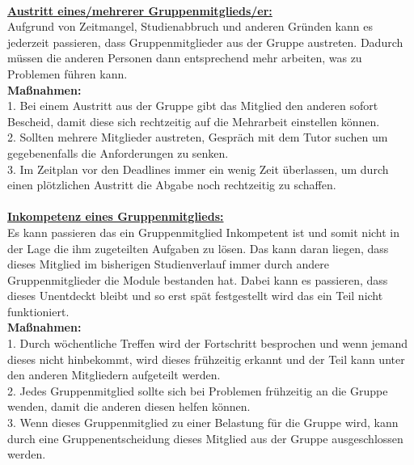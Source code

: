 \documentclass[fontsize=12pt,paper=a4,twoside]{scrartcl}
\begin{document}
\bigskip \\
\textbf{\underline{Austritt eines/mehrerer Gruppenmitglieds/er:}}\\
Aufgrund von Zeitmangel, Studienabbruch und anderen Gründen kann es jederzeit passieren, dass Gruppenmitglieder aus der Gruppe austreten. Dadurch müssen die anderen Personen dann entsprechend mehr arbeiten, was zu Problemen führen kann.\\
\textbf{Maßnahmen:}\\
1. Bei einem Austritt aus der Gruppe gibt das Mitglied den anderen sofort Bescheid, damit diese sich rechtzeitig auf die Mehrarbeit einstellen können.\\
2. Sollten mehrere Mitglieder austreten, Gespräch mit dem Tutor suchen um gegebenenfalls die Anforderungen zu senken.\\
3. Im Zeitplan vor den Deadlines immer ein wenig Zeit überlassen, um durch einen plötzlichen Austritt die Abgabe noch rechtzeitig zu schaffen.\\
\bigskip \\
\textbf{\underline{Inkompetenz eines Gruppenmitglieds:}}\\
Es kann passieren das ein Gruppenmitglied Inkompetent ist und somit nicht in der Lage die ihm zugeteilten Aufgaben zu lösen. Das kann daran liegen, dass dieses Mitglied im bisherigen Studienverlauf immer durch andere Gruppenmitglieder die Module bestanden hat. Dabei kann es passieren, dass dieses Unentdeckt bleibt und so erst spät festgestellt wird das ein Teil nicht funktioniert.\\
\textbf{Maßnahmen:}\\
1. Durch wöchentliche Treffen wird der Fortschritt besprochen und wenn jemand dieses nicht hinbekommt, wird dieses frühzeitig erkannt und der Teil kann unter den anderen Mitgliedern aufgeteilt werden.\\
2. Jedes Gruppenmitglied sollte sich bei Problemen frühzeitig an die Gruppe wenden, damit die anderen diesen helfen können. \\
3. Wenn dieses Gruppenmitglied zu einer Belastung für die Gruppe wird, kann durch eine Gruppenentscheidung dieses Mitglied aus der Gruppe ausgeschlossen werden. \\

\bigskip
\end{document}
